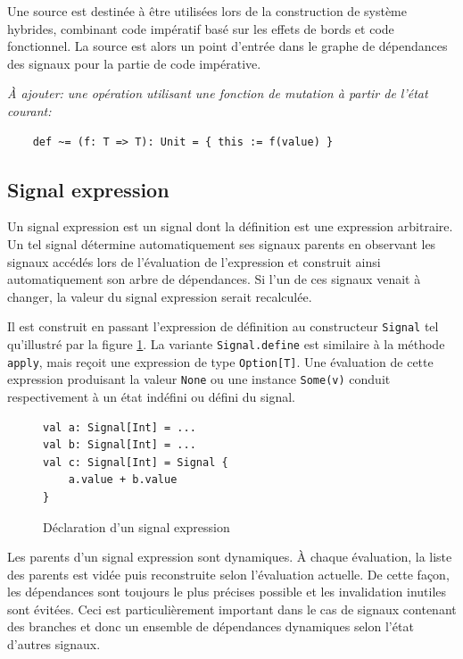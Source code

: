 Une source est destinée à être utilisées lors de la construction de système hybrides, combinant code impératif basé sur les effets de bords et code fonctionnel. La source est alors un point d'entrée dans le graphe de dépendances des signaux pour la partie de code impérative.

\textit{À ajouter: une opération utilisant une fonction de mutation à partir de l'état courant:}
\begin{lstlisting}
	def ~= (f: T => T): Unit = { this := f(value) }
\end{lstlisting}

\subsection{Signal expression} \label{sec:sig-expr}

Un signal expression est un signal dont la définition est une expression arbitraire. Un tel signal détermine automatiquement ses signaux parents en observant les signaux accédés lors de l'évaluation de l'expression et construit ainsi automatiquement son arbre de dépendances. Si l'un de ces signaux venait à changer, la valeur du signal expression serait recalculée.

Il est construit en passant l'expression de définition au constructeur \texttt{Signal} tel qu'illustré par la figure \ref{fig:signal-expr-init}. La variante \texttt{Signal.define} est similaire à la méthode \texttt{apply}, mais reçoit une expression de type \texttt{Option[T]}. Une évaluation de cette expression produisant la valeur \texttt{None} ou une instance \texttt{Some(v)} conduit respectivement à un état indéfini ou défini du signal.

\begin{figure}[!h]
	\begin{lstlisting}
val a: Signal[Int] = ...
val b: Signal[Int] = ...
val c: Signal[Int] = Signal {
	a.value + b.value
}
	\end{lstlisting}
	\caption{Déclaration d'un signal expression}
	\label{fig:signal-expr-init}
\end{figure}

Les parents d'un signal expression sont dynamiques. À chaque évaluation, la liste des parents est vidée puis reconstruite selon l'évaluation actuelle. De cette façon, les dépendances sont toujours le plus précises possible et les invalidation inutiles sont évitées. Ceci est particulièrement important dans le cas de signaux contenant des branches et donc un ensemble de dépendances dynamiques selon l'état d'autres signaux.

